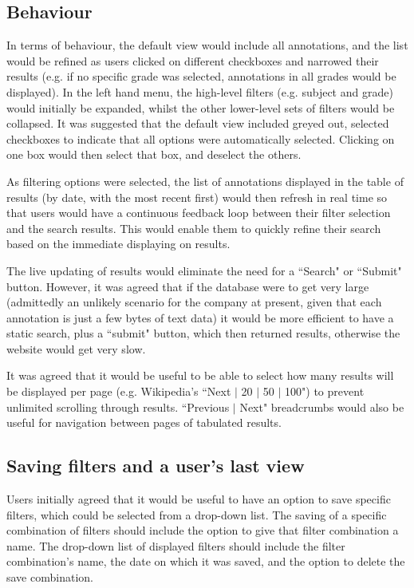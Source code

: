 \subsection{Behaviour}
In terms of behaviour,  the default view would include all annotations, and the list would be refined as users clicked on different checkboxes and narrowed their results (e.g. if no specific grade was selected, annotations in all grades would be displayed). In the left hand menu, the high-level filters (e.g. subject and grade) would initially be expanded, whilst the other lower-level sets of filters would be collapsed. It was suggested that the default view included greyed out, selected checkboxes to indicate that all options were automatically selected. Clicking on one box would then select that box, and deselect the others. 

As filtering options were selected, the list of annotations displayed in the table of results (by date, with the most recent first) would then refresh in real time so that users would have a continuous feedback loop between their filter selection and the search results. This would enable them to quickly refine their search based on the immediate displaying on results.

The live updating of results would eliminate the need for a ``Search" or ``Submit" button. However, it was agreed that if the database were to get very large (admittedly an unlikely scenario for the company at present, given that each annotation is just a few bytes of text data) it would be more efficient to have a static search, plus a ``submit" button, which then returned results, otherwise the website would get very slow. 

It was agreed that it would be useful to be able to select how many results will be displayed per page (e.g. Wikipedia's ``Next $\vert$ 20 $\vert$ 50 $\vert$ 100") to prevent unlimited scrolling through results. ``Previous $\vert$ Next" breadcrumbs would also be useful for navigation between pages of tabulated results. 

\subsection{Saving filters and a user's last view}
Users initially agreed that it would be useful to have an option to save specific filters, which could be selected from a drop-down list. The saving of a specific combination of filters should include the option to give that filter combination a name. The drop-down list of displayed filters should include the filter combination's name, the date on which it was saved, and the option to delete the save combination.

